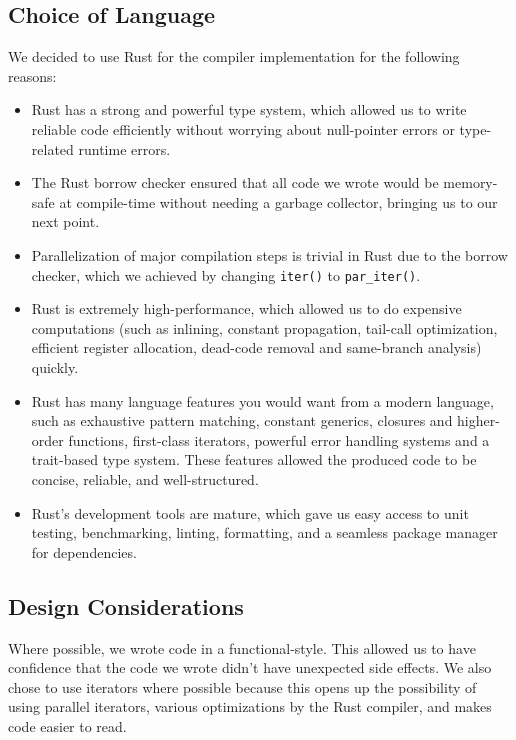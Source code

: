 \documentclass{article}
\newcommand{\compitem}[1]{\begin{itemize}\setlength\itemsep{-0.5em}#1\end{itemize}}
\begin{document}
        \subsection*{Choice of Language}
        We decided to use Rust for the compiler implementation for the following reasons:
        \compitem{
            \item Rust has a strong and powerful type system, which allowed us to write reliable code efficiently without worrying about null-pointer errors or type-related runtime errors.
            \item The Rust borrow checker ensured that all code we wrote would be memory-safe at compile-time without needing a garbage collector, bringing us to our next point.
            \item Parallelization of major compilation steps is trivial in Rust due to the borrow checker, which we achieved by changing \texttt{iter()} to \texttt{par_iter()}.
            \item Rust is extremely high-performance, which allowed us to do expensive computations (such as inlining, constant propagation, tail-call optimization, efficient register allocation, dead-code removal and same-branch analysis) quickly.
            \item Rust has many language features you would want from a modern language, such as exhaustive pattern matching, constant generics, closures and higher-order functions, first-class iterators, powerful error handling systems and a trait-based type system. These features allowed the produced code to be concise, reliable, and well-structured.
            \item Rust's development tools are mature, which gave us easy access to unit testing, benchmarking, linting, formatting, and a seamless package manager for dependencies.
        }
        \subsection*{Design Considerations}
        Where possible, we wrote code in a functional-style. This allowed us to have confidence that the code we wrote didn't have unexpected side effects. We also chose to use iterators where possible because this opens up the possibility of using parallel iterators, various optimizations by the Rust compiler, and makes code easier to read.
\end{document}

